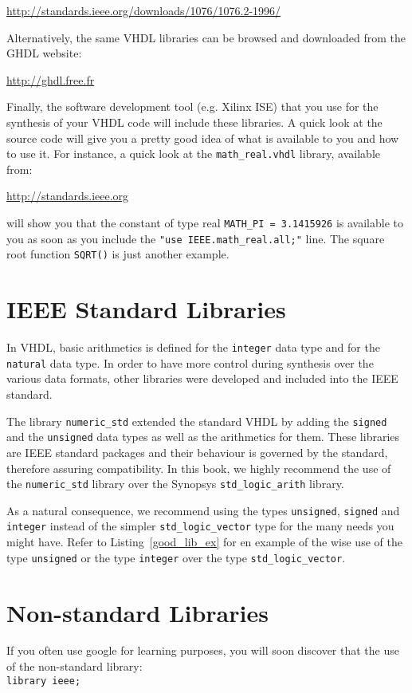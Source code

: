 \noindent
\url{http://standards.ieee.org/downloads/1076/1076.2-1996/}

\noindent
Alternatively, the same VHDL libraries can be browsed and downloaded from the GHDL website:

\noindent
\url{http://ghdl.free.fr}

\noindent
Finally, the software development tool (e.g. Xilinx ISE) that you use for the synthesis of your VHDL code will include these libraries. A quick look at the source code will give you a pretty good idea of what is available to you and how to use it. For instance, a quick look at the \texttt{math\_real.vhdl} library, available from:

\noindent
\url{http://standards.ieee.org}

\noindent
will show you that the constant of type real \texttt{MATH\_PI = 3.1415926} is available to you as soon as you include the \texttt{"use IEEE.math\_real.all;"} line. The square root function \texttt{SQRT()} is just another example.

\section{IEEE Standard Libraries}
In VHDL, basic arithmetics is defined for the \texttt{integer} data type and for the \texttt{natural} data type. In order to have more control during synthesis over the various data formats, other libraries were developed and included into the IEEE standard.

The library \texttt{numeric\_std} extended the standard VHDL by adding the \texttt{signed} and the \texttt{unsigned} data types as well as the arithmetics for them. These libraries are IEEE standard packages and their behaviour is governed by the standard, therefore assuring compatibility. In this book, we highly recommend the use of the \texttt{numeric\_std} library over the Synopsys \texttt{std\_logic\_arith} library.

As a natural consequence, we recommend using the types \texttt{unsigned}, \texttt{signed} and \texttt{integer} instead of the simpler \texttt{std\_logic\_vector} type for the many needs you might have. Refer to Listing~\ref{good_lib_ex} for en example of the wise use of the type \texttt{unsigned} or the type \texttt{integer} over the type \texttt{std\_logic\_vector}.

\section{Non-standard Libraries}
If {you often use google for learning purposes}, you will soon discover that the use of the non-standard library:\\
\texttt{library ieee;}

